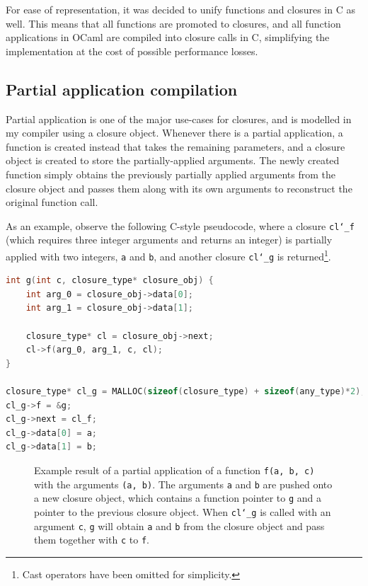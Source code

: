 For ease of representation, it was decided to unify functions and closures in C
as well. This means that all functions are promoted to closures, and all
function applications in OCaml are compiled into closure calls in C, simplifying
the implementation at the cost of possible performance losses.

\subsection{Partial application compilation} \label{partial-app}

Partial application is one of the major use-cases for closures, and is modelled
in my compiler using a closure object. Whenever there is a partial application,
a function is created instead that takes the remaining parameters, and a closure
object is created to store the partially-applied arguments. The newly created
function simply obtains the previously partially applied arguments from the
closure object and passes them along with its own arguments to reconstruct the
original function call.

As an example, observe the following C-style pseudocode, where a closure
\texttt{cl\char`_f} (which requires three integer arguments and returns an
integer) is partially applied with two integers, \texttt{a} and \texttt{b}, and
another closure \texttt{cl\char`_g} is returned\footnote{Cast operators have
been omitted for simplicity.}.

\begin{lstlisting}[language=C]
int g(int c, closure_type* closure_obj) {
    int arg_0 = closure_obj->data[0];
    int arg_1 = closure_obj->data[1];
    
    closure_type* cl = closure_obj->next;
    cl->f(arg_0, arg_1, c, cl);
}

closure_type* cl_g = MALLOC(sizeof(closure_type) + sizeof(any_type)*2);
cl_g->f = &g;
cl_g->next = cl_f;
cl_g->data[0] = a;
cl_g->data[1] = b;
\end{lstlisting}

\begin{figure}
    \centering
    
    \caption{Example result of a partial application of a function \texttt{f(a, 
    b, c)} with the arguments \texttt{(a, b)}. The arguments \texttt{a} and 
    \texttt{b} are pushed onto a new closure object, which contains a function 
    pointer to \texttt{g} and a pointer to the previous closure object. When 
    \texttt{cl\char`_g} is called with an argument \texttt{c}, \texttt{g} will 
    obtain \texttt{a} and \texttt{b} from the closure object and pass them 
    together with \texttt{c} to \texttt{f}.}
    \label{fig:partial-app}
\end{figure}

